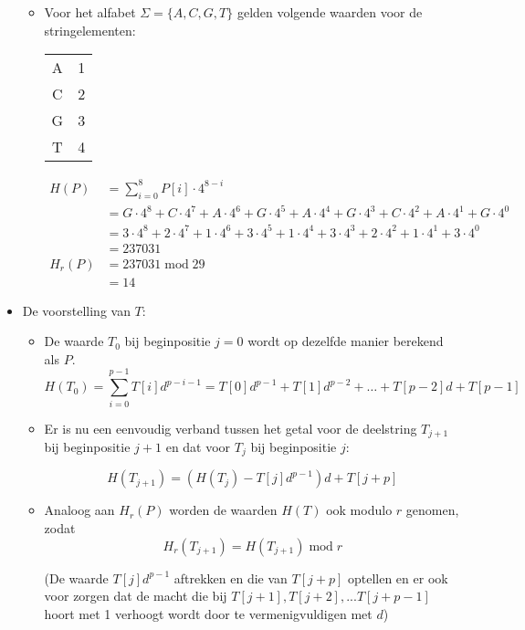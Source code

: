 \begin{itemize}
\begin{itemize}
        
        \item Voor het alfabet $\Sigma = \{A, C, G, T\}$ gelden volgende waarden voor de stringelementen:
        \begin{table}[ht]
            \centering
            \begin{tabular}{c | c}
                A & 1 \\
                C & 2 \\
                G & 3 \\
                T & 4 
            \end{tabular}
        \end{table}
        \begin{align*}
            H(P) &= \sum_{i=0}^{8} P[i] \cdot 4^{8-i} \\
                 &= G\cdot 4^8 + C\cdot 4^7 + A\cdot 4^6 + G\cdot 4^5 + A\cdot 4^4 + G\cdot 4^3 + C\cdot 4^2 + A\cdot 4^1 + G\cdot 4^0\\
                 &= 3\cdot 4^8 + 2\cdot 4^7 + 1\cdot 4^6 + 3\cdot 4^5 + 1\cdot 4^4 + 3\cdot 4^3 + 2\cdot 4^2 + 1\cdot 4^1 + 3\cdot 4^0\\
                 &= 237031 \\
            H_r(P) &= 237031\;\mathrm{mod}\;29\\
                   &= 14
        \end{align*}
    \end{itemize}
    \item De voorstelling van $T$:
    \begin{itemize}
        \item De waarde $T_0$ bij beginpositie $j = 0$ wordt op dezelfde manier berekend als $P$.
        $$H(T_0) = \sum_{i=0}^{p-1} T[i]d^{p-i-1} = T[0]d^{p-1} + T[1]d^{p-2} + \dots + T[p-2]d + T[p-1]$$

        \item Er is nu een eenvoudig verband tussen het getal voor de deelstring $T_{j + 1}$ bij beginpositie $j + 1$ en dat voor $T_{j}$ bij beginpositie $j$:

        $$H(T_{j + 1}) = (H(T_j) - T[j]d^{p-1})d + T[j + p]$$

        \item Analoog aan $H_r(P)$ worden de waarden $H(T)$ ook modulo $r$ genomen, zodat $$H_r(T_{j + 1}) = H(T_{j + 1})\;\mathrm{mod}\;r$$

        (De waarde $T[j]d^{p-1}$ aftrekken en die van $T[j + p]$ optellen en er ook voor zorgen dat de macht die bij $T[j +1], T[j + 2], ... T[j + p -1]$  hoort met 1 verhoogt wordt door te vermenigvuldigen met $d$)


\end{itemize}
\end{itemize}
